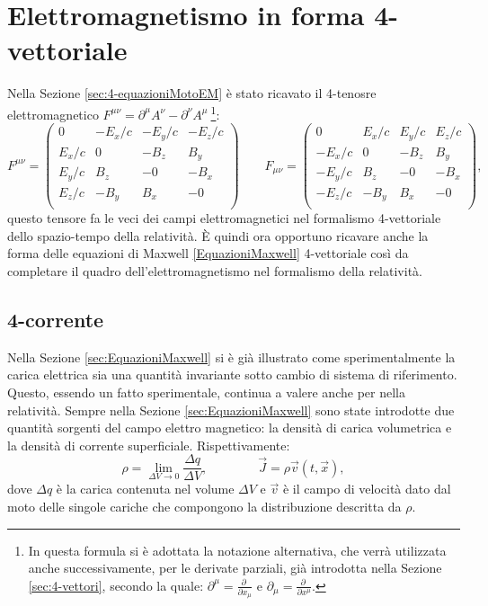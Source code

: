 \section{Elettromagnetismo in forma 4-vettoriale}
Nella Sezione \ref{sec:4-equazioniMotoEM} è stato ricavato il 4-tenosre elettromagnetico $F^{\mu\nu}=\partial^\mu A^\nu-\partial^\nu A^\mu\ $\footnote{In questa formula si è adottata la notazione alternativa, che verrà utilizzata anche successivamente, per le derivate parziali, già introdotta nella Sezione \ref{sec:4-vettori}, secondo la quale: $\partial^\mu=\frac{\partial\ }{\partial x_\mu}$ e $\partial_\mu=\frac{\partial\ }{\partial x^\mu}$.}:
\begin{equation*}
        F^{\mu\nu}=
    \begin{pmatrix}
        0&-E_x/c&-E_y/c&-E_z/c\\
        E_x/c&0&-B_z&B_y\\
        E_y/c&B_z&-0&-B_x\\
        E_z/c&-B_y&B_x&-0\\
 \end{pmatrix}\qquad
 F_{\mu\nu}=
 \begin{pmatrix}
     0&E_x/c&E_y/c&E_z/c\\
     -E_x/c&0&-B_z&B_y\\
     -E_y/c&B_z&-0&-B_x\\
     -E_z/c&-B_y&B_x&-0\\
\end{pmatrix},
\end{equation*}
questo tensore fa le veci dei campi elettromagnetici nel formalismo 4-vettoriale dello spazio-tempo della relatività.
È quindi ora opportuno ricavare anche la forma delle equazioni di Maxwell \eqref{EquazioniMaxwell} 4-vettoriale così da completare il quadro dell'elettromagnetismo nel formalismo della relatività.
\subsection{4-corrente}
Nella Sezione \ref{sec:EquazioniMaxwell} si è già illustrato come sperimentalmente la carica elettrica sia una quantità invariante sotto cambio di sistema di riferimento. Questo, essendo un fatto sperimentale, continua a valere anche per nella relatività. Sempre nella Sezione \ref{sec:EquazioniMaxwell} sono state introdotte due quantità sorgenti del campo elettro magnetico: la densità di carica volumetrica e la densità di corrente superficiale. Rispettivamente:
\begin{equation}
    \rho=\lim_{\Delta V\rightarrow 0}\frac{\Delta q}{\Delta V},\qquad\qquad \vec J=\rho\vec v(t,\vec x),\label{defRhoJ}
\end{equation}
dove $\Delta q$ è la carica contenuta nel volume $\Delta V$ e $\vec v$ è il campo di velocità dato dal moto delle singole cariche che compongono la distribuzione descritta da $\rho$.\\

